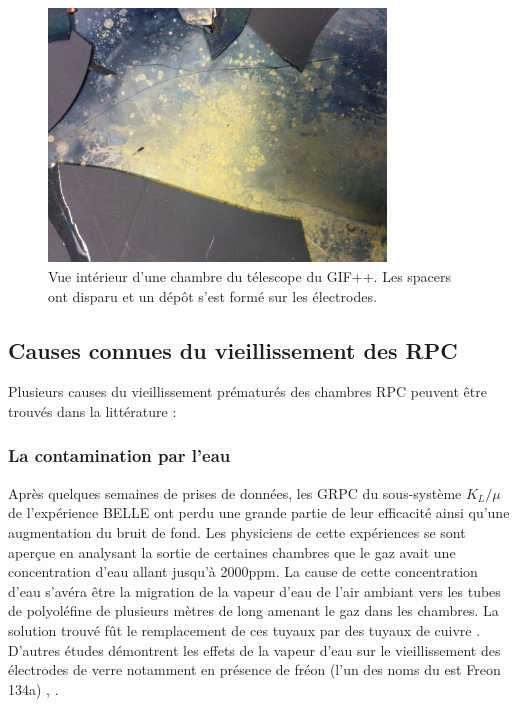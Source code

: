 \begin{figure}[!ht]
	\centering
	\includegraphics[width=0.8\textwidth]{GLA/depot.jpg}
	\caption{Vue intérieur d'une chambre du télescope du GIF++. Les spacers ont disparu et un dépôt s'est formé sur les électrodes. }
	\label{depot}
\end{figure}

\subsection{Causes connues du vieillissement des RPC }
Plusieurs causes du vieillissement prématurés des chambres RPC peuvent être trouvés dans la littérature :

\subsubsection{La contamination par l'eau}
Après quelques semaines de prises de données, les GRPC du sous-système $K_{L}/\mu$ de l'expérience BELLE ont perdu une grande partie de leur efficacité ainsi qu'une augmentation du bruit de fond. Les physiciens de cette expériences se sont aperçue en analysant la sortie de certaines chambres que le gaz avait une concentration d'eau allant jusqu'à \num{2000}ppm. La cause de cette concentration d'eau s'avéra être la migration de la vapeur d'eau de l'air ambiant  vers les tubes de polyoléfine de plusieurs mètres de long amenant le gaz dans les chambres. La solution trouvé fût le remplacement de ces tuyaux par des tuyaux de cuivre \cite{Abashian:2000vb}. D'autres études démontrent les effets de la vapeur d'eau sur le vieillissement des électrodes de verre notamment en présence de fréon (l'un des noms du  est Freon 134a) \cite{Sakai:772080}, \cite{Kubo:2002jq}.


